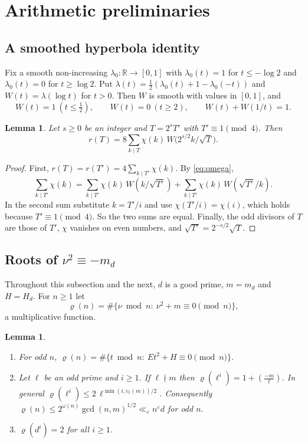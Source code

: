 \documentclass[11pt]{amsart}
\newtheorem{lemma}[theorem]{Lemma}
\theoremstyle{remark}
\theoremstyle{definition}
\numberwithin{equation}{section}
\newcommand{\R}{\mathbb{R}}
\newcommand{\eps}{\varepsilon}
\newcommand{\leg}[2]{\left(\frac{#1}{#2}\right)}
\begin{document}
\section{Arithmetic preliminaries}\label{sec:prelim}

\subsection{A smoothed hyperbola identity}
Fix a smooth non-increasing $\lambda_0:\R\to[0,1]$ with $\lambda_0(t)=1$ for $t\le-\log2$ and $\lambda_0(t)=0$ for $t\ge\log 2$. Put $\lambda(t)=\frac12(\lambda_0(t)+1-\lambda_0(-t))$ and $W(t)=\lambda(\log t)$ for $t>0$. Then $W$ is smooth with values in $[0,1]$, and
\begin{equation}\label{eq:omega}
W(t)=1\ (t\le\tfrac12),\qquad W(t)=0\ (t\ge2),\qquad W(t)+W(1/t)=1 .
\end{equation}

\begin{lemma}\label{lem:hyperbola}
Let $s\ge0$ be an integer and $T=2^sT'$ with $T'\equiv1\pmod 4$. Then
\[
r(T)=8\sum_{k\mid T}\chi(k)\,W\bigl(2^{s/2}k/\sqrt T\bigr).
\]
\end{lemma}

\begin{proof}
First, $r(T)=r(T')=4\sum_{k\mid T'}\chi(k)$. By \eqref{eq:omega},
\[
\sum_{k\mid T'}\chi(k)=\sum_{k\mid T'}\chi(k)\,W(k/\sqrt{T'})+\sum_{k\mid T'}\chi(k)\,W(\sqrt{T'}/k).
\]
In the second sum substitute $k=T'/i$ and use $\chi(T'/i)=\chi(i)$, which holds because $T'\equiv1\pmod 4$. So the two sums are equal. Finally, the odd divisors of $T$ are those of $T'$, $\chi$ vanishes on even numbers, and $\sqrt{T'}=2^{-s/2}\sqrt T$.
\end{proof}

\subsection{\texorpdfstring{Roots of $\nu^2\equiv-m_d$}{Square roots of -m}}
Throughout this subsection and the next, $d$ is a good prime, $m=m_d$ and $H=H_d$. For $n\ge1$ let
\[
\varrho(n)=\#\{\nu\bmod n:\ \nu^2+m\equiv0\pmod n\},
\]
a multiplicative function.

\begin{lemma}\label{lem:rho}
\begin{enumerate}
\item[(a)] For odd $n$, $\varrho(n)=\#\{t\bmod n:\ Et^2+H\equiv0\pmod n\}$.
\item[(b)] Let $\ell$ be an odd prime and $i\ge1$. If $\ell\nmid m$ then $\varrho(\ell^i)=1+\leg{-m}{\ell}$. In general $\varrho(\ell^i)\le2\,\ell^{\min(i,v_\ell(m))/2}$. Consequently $\varrho(n)\le 2^{\omega(n)}\gcd(n,m)^{1/2}\ll_\eps n^{\eps}d$ for odd $n$.
\item[(c)] $\varrho(d^i)=2$ for all $i\ge1$.
\end{enumerate}
\end{lemma}
\end{document}
